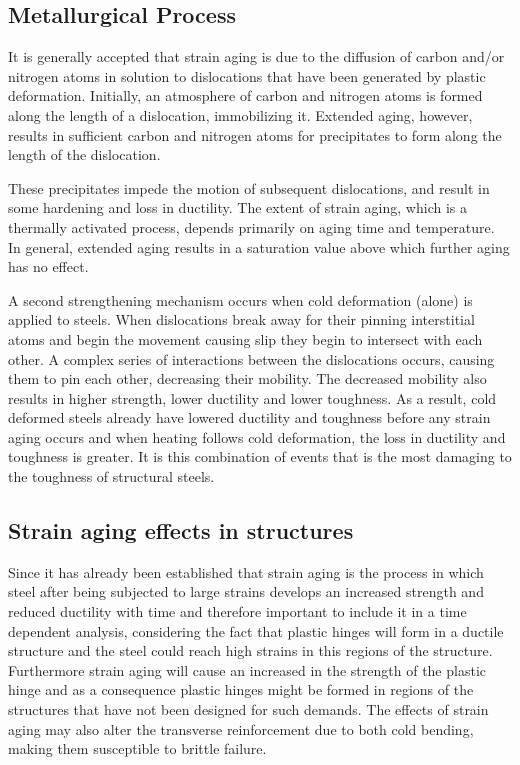 \subsection{Metallurgical Process}

It is generally accepted that strain aging is due to the diffusion of carbon and/or nitrogen atoms in solution to dislocations that have been generated by plastic deformation. Initially, an atmosphere of carbon and nitrogen atoms is formed along the length of a dislocation, immobilizing it. Extended aging, however, results in sufficient carbon and nitrogen atoms for precipitates to form along the length of the dislocation.

These precipitates impede the motion of subsequent dislocations, and result in some hardening and loss in ductility. The extent of strain aging, which is a thermally activated process, depends primarily on aging time and temperature. In general, extended aging results in a saturation value above which further aging has no effect.

A second strengthening mechanism occurs when cold deformation (alone) is applied to steels. When dislocations break away for their pinning interstitial atoms and begin the movement causing slip they begin to intersect with each other. A complex series of interactions between the dislocations occurs, causing them to pin each other, decreasing their mobility. The decreased mobility also results in higher strength, lower ductility and lower toughness. As a result, cold deformed steels already have lowered ductility and toughness before any strain aging occurs and when heating follows cold deformation, the loss in ductility and toughness is greater. It is this combination of events that is the most damaging to the toughness of structural steels.

\subsection{Strain aging effects in structures}

Since it has already been established that strain aging is the process in which steel after being subjected to large strains develops an increased strength and reduced ductility with time and therefore important to include it in a time dependent analysis, considering the fact that plastic hinges will form in a ductile structure and the steel could reach high strains in this regions of the structure. Furthermore strain aging will cause an increased in the strength of the plastic hinge and as a consequence plastic hinges might be formed in regions of the structures that have not been designed for such demands. The effects of strain aging may also alter the transverse reinforcement due to both cold bending, making them susceptible to brittle failure.

